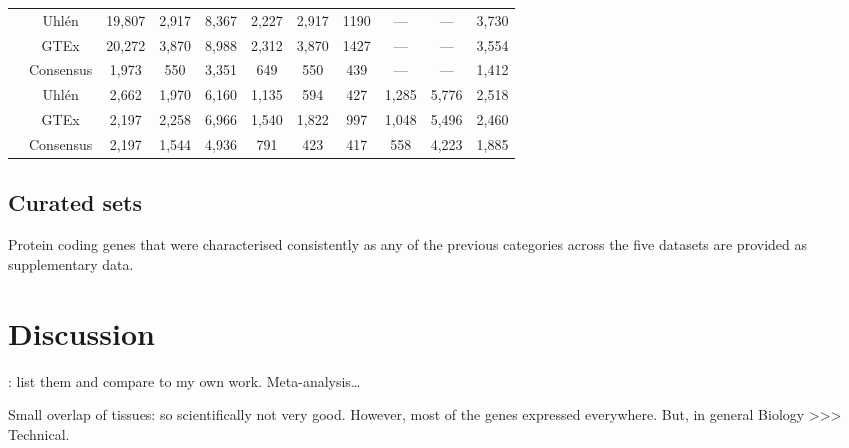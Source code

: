 \begin{landscape}
\begin{table}[]
\begin{tabular}{@{}ccccccccccc@{}}
& Uhlén & 19,807 & 2,917 & 8,367 & 2,227 &
2,917  & 1190  & --- & --- & 3,730  \\
& GTEx & 20,272 & 3,870 & 8,988  & 2,312 &
3,870  & 1427  & --- & --- & 3,554  \\
\cmidrule(l){2-11}
& Consensus & 1,973 & 550 & 3,351 & 649 &
550  & 439 & --- & --- & 1,412  \\
\midrule
\multirow{3}{*}{\rotatebox[origin=c]{90}{\parbox[c]{1.7cm}{\centering Common\\ 23
tissues\\ Working datasets}}} & Uhlén & 2,662  & 1,970  &
6,160 & 1,135 & 594  & 427 & 1,285 &
5,776 & 2,518 \\
& GTEx & 2,197 & 2,258 & 6,966  & 1,540 &
1,822  & 997 & 1,048 & 5,496  & 2,460 \\
\cmidrule(l){2-11}
& Consensus & 2,197 & 1,544 & 4,936 & 791 &
423 & 417 & 558 & 4,223 & 1,885 \\
\bottomrule
\end{tabular}
\end{table}
\end{landscape}
\pagestyle{scrheadings}


\subsection{Curated sets}\label{subsec:Trans_curatedSets}
Protein coding genes that were characterised consistently
as any of the previous categories across the five datasets
are provided as supplementary data.


\section{Discussion}\label{sec:Trans_discussion}
: list them and compare to my own
work. Meta-analysis\ldots

Small overlap of tissues: so scientifically not very good.
However, most of the genes expressed everywhere.
But, in general Biology >>> Technical.


